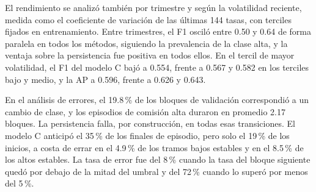 El rendimiento se analizó también por trimestre y según la volatilidad reciente, medida como el coeficiente de variación de las últimas 144 tasas, con terciles fijados en entrenamiento. Entre trimestres, el F1 osciló entre 0.50 y 0.64 de forma paralela en todos los métodos, siguiendo la prevalencia de la clase alta, y la ventaja sobre la persistencia fue positiva en todos ellos. En el tercil de mayor volatilidad, el F1 del modelo C bajó a 0.554, frente a 0.567 y 0.582 en los terciles bajo y medio, y la AP a 0.596, frente a 0.626 y 0.643.

En el análisis de errores, el 19.8\,\% de los bloques de validación correspondió a un cambio de clase, y los episodios de comisión alta duraron en promedio 2.17 bloques. La persistencia falla, por construcción, en todas esas transiciones. El modelo C anticipó el 35\,\% de los finales de episodio, pero solo el 19\,\% de los inicios, a costa de errar en el 4.9\,\% de los tramos bajos estables y en el 8.5\,\% de los altos estables. La tasa de error fue del 8\,\% cuando la tasa del bloque siguiente quedó por debajo de la mitad del umbral y del 72\,\% cuando lo superó por menos del 5\,\%.
